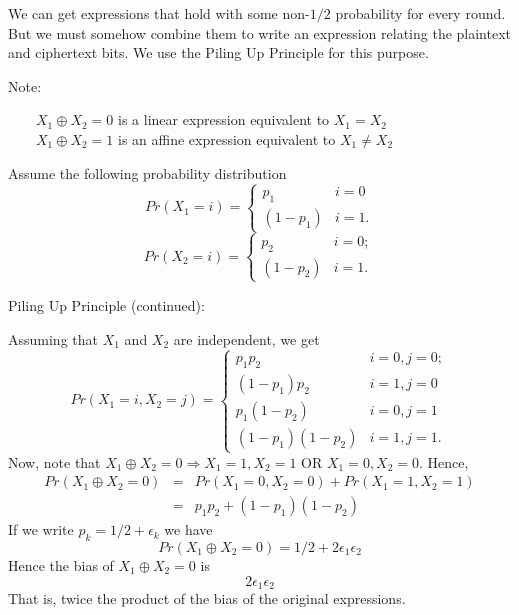 \documentclass[9pt]{beamer}
\begin{document}
\begin{frame}
We can get expressions that hold with some non-$1/2$ probability for every round. But we must somehow combine them to write an expression relating the plaintext and ciphertext bits. \pause We use the Piling Up Principle for this purpose.

\vspace{5mm}
\pause Note:

$\qquad X_1 \oplus X_2 = 0$ is a linear expression equivalent to $X_1 = X_2$\\
$\qquad X_1 \oplus X_2 = 1$ is an affine expression equivalent to $X_1 \neq X_2$

\vspace{5mm}
\pause Assume the following probability distribution
\[ Pr(X_1 = i)  = \left\{ \begin{array}{ll}
         p_1 & \mbox{$i = 0$}\\
         (1 - p_1) & \mbox{$i = 1$}.\end{array} \right. \] 
\[ Pr(X_2 = i)  = \left\{ \begin{array}{ll}
         p_2 & \mbox{$i = 0$};\\
         (1 - p_2) & \mbox{$i = 1$}.\end{array} \right. \] 
\end{frame}

\begin{frame}
Piling Up Principle (continued):

\vspace{5mm}
Assuming that $X_1$ and $X_2$ are independent, we get
\[ Pr(X_1 = i, X_2 = j)  = \left\{ \begin{array}{ll}
         p_1 p_2 & \mbox{$i = 0, j = 0$};\\
         (1 - p_1) p_2 & \mbox{$i = 1, j = 0$} \\
			p_1 (1 - p_2) & \mbox{$i = 0, j = 1$} \\
			(1 - p_1)(1 - p_2) & \mbox{$i = 1, j = 1$}.\end{array} \right. \] 
\pause Now, note that $X_1 \oplus X_2 = 0 \Rightarrow X_1 = 1, X_2 =1$ OR $X_1 = 0, X_2 = 0$. \pause Hence,
\begin{eqnarray*}
 Pr(X_1 \oplus X_2 = 0) & = & Pr(X_1=0,X_2=0) + Pr(X_1=1,X_2=1) \\
								& = & p_1p_2 + (1 - p_1)(1-p_2)
\end{eqnarray*}
\pause If we write $p_k = 1/2 + \epsilon_k$ we have
\[ Pr(X_1 \oplus X_2 = 0) = 1/2 + 2\epsilon_1 \epsilon_2 \]
\pause Hence the bias of $X_1 \oplus X_2 = 0$ is 
\[ 2 \epsilon_1 \epsilon_2 \]
That is, twice the product of the bias of the original expressions.
\end{frame}
\end{document}
